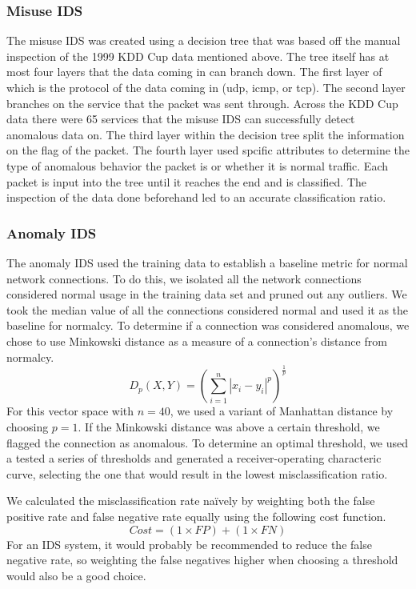 \documentclass[letterpaper,12pt]{article}
\begin{document}
\subsubsection*{Misuse IDS}
The misuse IDS was created using a decision tree that was based off the manual
inspection of the 1999 KDD Cup data mentioned above. The tree itself has at most
four layers that the data coming in can branch down. The first layer of which is
the protocol of the data coming in (udp, icmp, or tcp). The second layer
branches on the service that the packet was sent through. Across the KDD Cup
data there were 65 services that the misuse IDS can successfully detect
anomalous data on. The third layer within the decision tree split the
information on the flag of the packet. The fourth layer used spcific attributes
to determine the type of anomalous behavior the packet is or whether it is
normal traffic. Each packet is input into the tree until it reaches the end and
is classified. The inspection of the data done beforehand led to an accurate
classification ratio. \par

\subsubsection*{Anomaly IDS}
The anomaly IDS used the training data to establish a baseline metric for
normal network connections. To do this, we isolated all the network connections
considered normal usage in the training data set and pruned out any outliers.
We took the median value of all the connections considered normal and used it
as the baseline for normalcy. To determine if a connection was considered
anomalous, we chose to use Minkowski distance as a measure of a connection's
distance from normalcy.
\[ D_p(X,Y) = \left(\sum_{i=1}^{n}|x_i-y_i|^p\right)^{\frac{1}{p}} \]
For this vector space with \( n = 40 \), we used a variant of Manhattan
distance by choosing \( p = 1 \). If the Minkowski distance was above a certain
threshold, we flagged the connection as anomalous. To determine an optimal
threshold, we used a tested a series of thresholds and generated a
receiver-operating characteric curve, selecting the one that would result in
the lowest misclassification ratio. \par
We calculated the misclassification rate na\"{i}vely by weighting both the
false positive rate and false negative rate equally using the following cost
function.
\[ Cost = (1\times FP) + (1\times FN) \]
For an IDS system, it would probably be recommended to reduce the false
negative rate, so weighting the false negatives higher when choosing a
threshold would also be a good choice.
\end{document}

